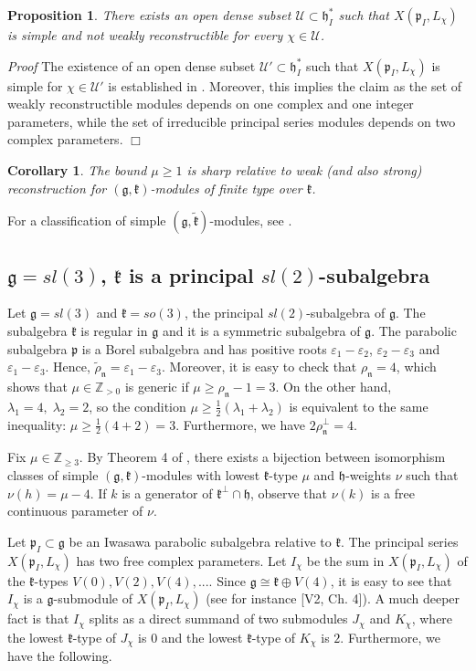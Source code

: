 \documentclass[11pt]{amsart}
\newcounter{theorem}
\newtheorem{corollary}[theo]{Corollary}
\newtheorem{prop}[theo]{Proposition}
\renewenvironment{proof}{ \emph{Proof}}{$\Box$}
\newcommand{\kk}{\mathfrak{k}}
\newcommand{\nn}{\mathfrak{n}}
\newcommand{\hh}{\mathfrak{h}}
\newcommand{\pp}{\mathfrak{p}}
\renewcommand{\gg}{\mathfrak{g}}
\newcommand{\field}[1]{\mathbb{#1}}
\begin{document}
\begin{prop}\label{pr8.7}
There exists an open dense subset $\mathcal{U}\subset\hh_I^*$ such that $X(\pp_I,L_\chi)$ is simple and not weakly reconstructible for every $\chi\in\mathcal{U}$.
\end{prop}
\begin{proof}
The existence of an open dense subset $\mathcal{U'}\subset\hh_{I}^*$ such that $X(\pp_I,L_\chi)$ is simple for $\chi\in \mathcal{U'}$ is established in \cite{Kra}. Moreover, this implies the claim as the set of weakly reconstructible modules depends on one complex and one integer parameters, while the set of irreducible principal series modules depends on two complex parameters.
\end{proof}
\begin{corollary} %
The bound $\mu\geq 1$ is sharp relative to weak (and also strong) reconstruction for $(\gg,\kk)$-modules of finite type over $\kk$.
\end{corollary}


For a classification of simple $(\gg,\tilde{\kk})$-modules, see \cite{Kra}.

\subsection{$\gg=sl(3)$, $\kk$ is a principal $sl(2)$-subalgebra} %

Let $\gg=sl(3)$ and $\kk=so(3)$, the principal $sl(2)$-subalgebra of $\gg$. The subalgebra $\kk$ is regular in $\gg$ and it is a symmetric subalgebra of $\gg$. The parabolic subalgebra $\pp$ is a Borel subalgebra and has positive roots $\varepsilon_1-\varepsilon_2$, $\varepsilon_2-\varepsilon_3$ and $\varepsilon_1-\varepsilon_3$. Hence, $\tilde{\rho}_\nn=\varepsilon_1-\varepsilon_3$. Moreover, it is easy to check that $\rho_\nn =4$, which shows that $\mu\in\field{Z}_{>0}$ is generic if $\mu\geq\rho_\nn -1=3$. On the other hand, $\lambda_1=4,\; \lambda_2=2$, so the condition $\mu\geq\frac{1}{2}(\lambda_1+\lambda_2)$ is equivalent to the same inequality: $\mu\geq\frac{1}{2}(4+2)=3$. Furthermore, we have $2\rho_\nn^\perp=4$.

Fix $\mu\in\field{Z}_{\geq 3}$. By Theorem 4 of \cite{PZ2}, there exists a bijection between isomorphism classes of simple $(\gg,\kk)$-modules with lowest $\kk$-type $\mu$ and $\hh$-weights $\nu$ such that $\nu(h)=\mu-4$. If $k$ is a generator of $\kk^\perp\cap\hh$, observe that $\nu(k)$ is a free continuous parameter of $\nu$.

Let $\pp_I\subset\gg$ be an Iwasawa parabolic subalgebra relative to $\kk$. The principal series $X(\pp_I,L_\chi)$ has two free complex parameters. Let $I_\chi$ be the sum in $X(\pp_I,L_\chi)$ of the $\kk$-types $V(0), V(2), V(4),...$. Since $\gg\cong\kk\oplus V(4)$, it is easy to see that $I_\chi$ is a $\gg$-submodule of $X(\pp_I,L_\chi)$ (see for instance [V2, Ch. 4]). A much deeper fact is that $I_\chi$ splits as a direct summand of two submodules $J_\chi$ and $K_\chi$, where the lowest $\kk$-type of $J_\chi$ is $0$ and the lowest $\kk$-type of $K_\chi$ is $2$. Furthermore, we have the following.
\end{document}
